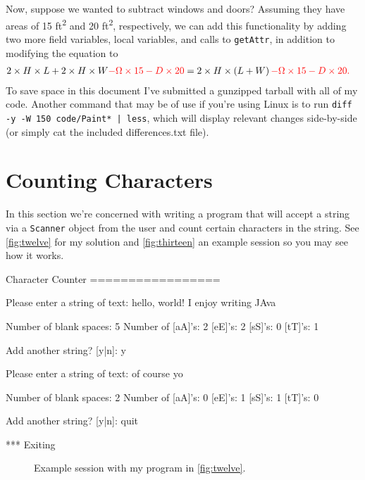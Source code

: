 \documentclass[leqno, 11pt]{article}
\begin{document}
Now, suppose we wanted to subtract windows and doors? Assuming they have areas of 15 \si{ft^{2}} and 20 \si{ft^{2}}, respectively, we can add this functionality by adding two more field variables, local variables, and calls to \texttt{getAttr}, in addition to modifying the equation to
\begin{align}
  2\times H\times L + 2\times H\times W \color{red}{- \Omega\times 15 - D\times 20}&=2\times H\times\left(L + W\right)\color{red}{- \Omega\times 15 - D\times 20}.\notag
\end{align}
To save space in this document I've submitted a gunzipped tarball with all of my code. Another command that may be of use if you're using Linux is to run \texttt{diff -y -W 150 code/Paint* | less}, which  will display relevant changes side-by-side (or simply cat the included differences.txt file).
\section*{Counting Characters}
In this section we're concerned with writing a program that will accept a string via a \texttt{Scanner} object from the user and count certain characters in the string. See \autoref{fig:twelve} for my solution and \autoref{fig:thirteen} an example session so you may see how it works.
\begin{verbbox}[\mbox{}\scriptsize]
Character Counter
=================

Please enter a string of text: hello, world! I enjoy writing JAva

Number of blank spaces: 5
Number of [aA]'s: 2
          [eE]'s: 2
          [sS]'s: 0
          [tT]'s: 1

Add another string? [y|n]: y

Please enter a string of text: of course yo

Number of blank spaces: 2
Number of [aA]'s: 0
          [eE]'s: 1
          [sS]'s: 1
          [tT]'s: 0

Add another string? [y|n]: quit

*** Exiting
\end{verbbox}
\begin{figure}[t!]
  \centering
  \theverbbox
  \caption{Example session with my program in \autoref{fig:twelve}.}
  \label{fig:thirteen}
\end{figure}
\end{document}
